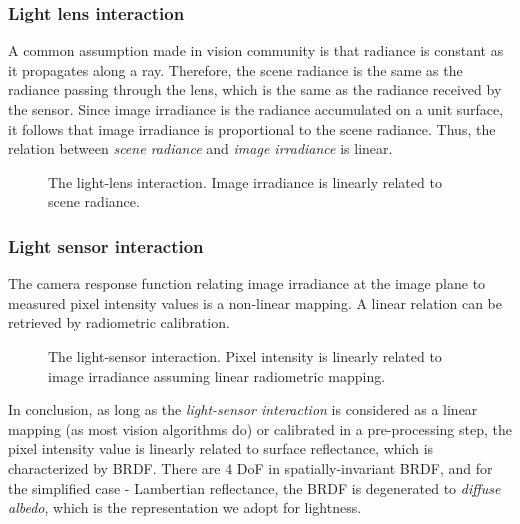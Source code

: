 \subsubsection{Light lens interaction}
A common assumption made in vision community is that radiance is constant as it propagates along a ray. Therefore, the scene radiance is the same as the radiance passing through the lens, which is the same as the radiance received by the sensor. Since image irradiance is the radiance accumulated on a unit surface, it follows that image irradiance is proportional to the scene radiance. Thus, the relation between \textit{scene radiance} and \textit{image irradiance} is linear.
\begin{figure}[!ht]
\centering
{}
\caption{The light-lens interaction. Image irradiance is linearly related to scene radiance.}
\label{fig:light_lens_interact}
\end{figure}

\subsubsection{Light sensor interaction}
The camera response function relating image irradiance at the image plane to measured pixel intensity values is a non-linear mapping. A linear relation can be retrieved by radiometric calibration.
\begin{figure}[!ht]
\centering
{}
\caption{The light-sensor interaction. Pixel intensity is linearly related to image irradiance assuming linear radiometric mapping.}
\label{fig:light_sensor_interact}
\end{figure}

In conclusion, as long as the \textit{light-sensor interaction} is considered as a linear mapping (as most vision algorithms do) or calibrated in a pre-processing step, the pixel intensity value is linearly related to surface reflectance, which is characterized by BRDF. There are 4 DoF in spatially-invariant BRDF, and for the simplified case - Lambertian reflectance, the BRDF is degenerated to \textit{diffuse albedo}, which is the representation we adopt for lightness.

